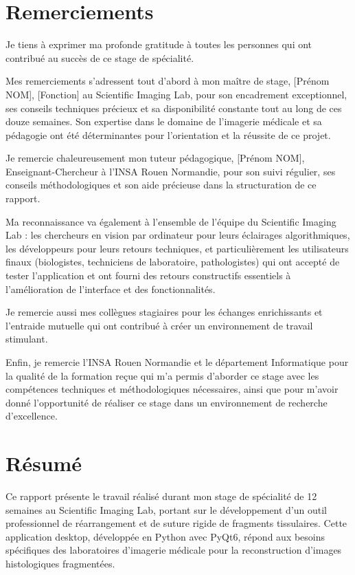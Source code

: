 \documentclass[12pt,a4paper]{report}
\begin{document}
\newpage
\chapter*{Remerciements}

Je tiens à exprimer ma profonde gratitude à toutes les personnes qui ont contribué au succès de ce stage de spécialité.

Mes remerciements s'adressent tout d'abord à mon maître de stage, [Prénom NOM], [Fonction] au Scientific Imaging Lab, pour son encadrement exceptionnel, ses conseils techniques précieux et sa disponibilité constante tout au long de ces douze semaines. Son expertise dans le domaine de l'imagerie médicale et sa pédagogie ont été déterminantes pour l'orientation et la réussite de ce projet.

Je remercie chaleureusement mon tuteur pédagogique, [Prénom NOM], Enseignant-Chercheur à l'INSA Rouen Normandie, pour son suivi régulier, ses conseils méthodologiques et son aide précieuse dans la structuration de ce rapport.

Ma reconnaissance va également à l'ensemble de l'équipe du Scientific Imaging Lab : les chercheurs en vision par ordinateur pour leurs éclairages algorithmiques, les développeurs pour leurs retours techniques, et particulièrement les utilisateurs finaux (biologistes, techniciens de laboratoire, pathologistes) qui ont accepté de tester l'application et ont fourni des retours constructifs essentiels à l'amélioration de l'interface et des fonctionnalités.

Je remercie aussi mes collègues stagiaires pour les échanges enrichissants et l'entraide mutuelle qui ont contribué à créer un environnement de travail stimulant.

Enfin, je remercie l'INSA Rouen Normandie et le département Informatique pour la qualité de la formation reçue qui m'a permis d'aborder ce stage avec les compétences techniques et méthodologiques nécessaires, ainsi que pour m'avoir donné l'opportunité de réaliser ce stage dans un environnement de recherche d'excellence.

\newpage
\chapter*{Résumé}

Ce rapport présente le travail réalisé durant mon stage de spécialité de 12 semaines au Scientific Imaging Lab, portant sur le développement d'un outil professionnel de réarrangement et de suture rigide de fragments tissulaires. Cette application desktop, développée en Python avec PyQt6, répond aux besoins spécifiques des laboratoires d'imagerie médicale pour la reconstruction d'images histologiques fragmentées.
\end{document}

